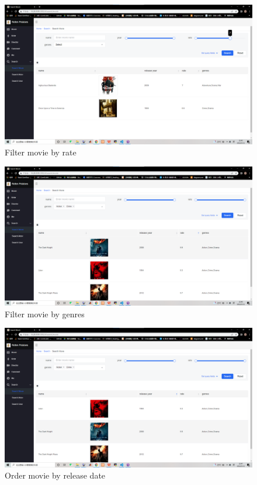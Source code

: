\begin{CJK*}{UTF8}{gbsn}
\begin{figure}[htbp]
\centering
\includegraphics[width=1\textwidth]{res_search4.png}
\caption{Filter movie by rate}
\end{figure}


\begin{figure}[htbp]
\centering
\includegraphics[width=1\textwidth]{res_search5.png}
\caption{Filter movie by genres}
\end{figure}

\begin{figure}[htbp]
\centering
\includegraphics[width=1\textwidth]{res_search6.png}
\caption{Order movie by release date}
\end{figure}


\end{CJK*}
